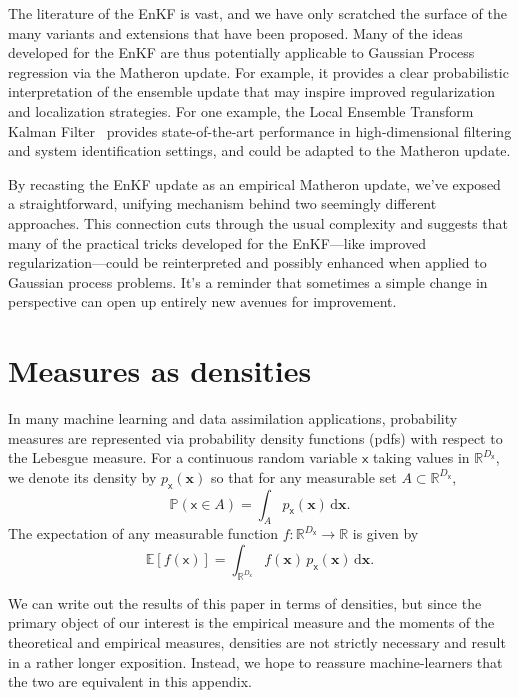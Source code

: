 \documentclass[wcp]{jmlr} %
\newcommand{\Ex}{\mathbb{E}}
\newcommand{\vv}[1]{\boldsymbol{#1}}
\newcommand{\rv}[1]{\mathsf{#1}}
\newcommand{\vrv}[1]{\vv{\rv{#1}}}
\renewcommand{\Pr}{\mathbb{P}}
\begin{document}
The literature of the EnKF is vast, and we have only scratched the surface of the many variants and extensions that have been proposed.
Many of the ideas developed for the EnKF are thus potentially applicable to Gaussian Process regression via the Matheron update.
For example, it provides a clear probabilistic interpretation of the ensemble update that may inspire improved regularization and localization strategies.
For one example, the Local Ensemble Transform Kalman Filter~\citep{Bocquet2020Online} provides state-of-the-art performance in high-dimensional filtering and system identification settings, and could be adapted to the Matheron update.

By recasting the EnKF update as an empirical Matheron update, we’ve exposed a straightforward, unifying mechanism behind two seemingly different approaches. This connection cuts through the usual complexity and suggests that many of the practical tricks developed for the EnKF—like improved regularization—could be reinterpreted and possibly enhanced when applied to Gaussian process problems. It’s a reminder that sometimes a simple change in perspective can open up entirely new avenues for improvement.



\appendix

\section{Measures as densities}\label{sec:densities-please}

In many machine learning and data assimilation applications, probability measures are represented via probability density functions (pdfs) with respect to the Lebesgue measure. For a continuous random variable \(\vrv{x}\) taking values in \(\mathbb{R}^{D_{\vrv{x}}}\), we denote its density by \(p_{\vrv{x}}(\vv{x})\) so that for any measurable set \(A \subset \mathbb{R}^{D_{\vrv{x}}}\),
\begin{equation}
    \Pr\left(\vrv{x} \in A\right)
    = \int_A p_{\vrv{x}}(\vv{x})\,\mathrm{d}\vv{x}.
\end{equation}
The expectation of any measurable function \(f:\mathbb{R}^{D_{\vrv{x}}}\to\mathbb{R}\) is given by
\begin{equation}
    \Ex[f(\vrv{x})] = \int_{\mathbb{R}^{D_{\vrv{x}}}} f(\vv{x})\,p_{\vrv{x}}(\vv{x})\,\mathrm{d}\vv{x}.
\end{equation}

We can write out the results of this paper in terms of densities, but since the primary object of our interest is the empirical measure and the moments of the theoretical and empirical measures, densities are not strictly necessary and result in a rather longer exposition.
Instead, we hope to reassure machine-learners that the two are equivalent in this appendix.
\end{document}
